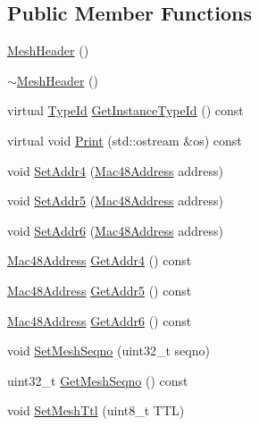 \subsection*{Public Member Functions}
\begin{DoxyCompactItemize}
\item 
\hyperlink{classns3_1_1dot11s_1_1MeshHeader_a0b260de050eab21794a300ad90af8257}{Mesh\+Header} ()
\item 
\hyperlink{classns3_1_1dot11s_1_1MeshHeader_a0dcc776fde719ec3a221f64a321d8484}{$\sim$\+Mesh\+Header} ()
\item 
virtual \hyperlink{classns3_1_1TypeId}{Type\+Id} \hyperlink{classns3_1_1dot11s_1_1MeshHeader_ad233531def8dbaf5250413efa6a1fe98}{Get\+Instance\+Type\+Id} () const 
\item 
virtual void \hyperlink{classns3_1_1dot11s_1_1MeshHeader_acf846f77244d80fb3770942851dc943a}{Print} (std\+::ostream \&os) const 
\item 
void \hyperlink{classns3_1_1dot11s_1_1MeshHeader_acd4f196e526875a606381c9cb950d725}{Set\+Addr4} (\hyperlink{classns3_1_1Mac48Address}{Mac48\+Address} address)
\item 
void \hyperlink{classns3_1_1dot11s_1_1MeshHeader_accb296eb081e0836fcd14ac45cb9593a}{Set\+Addr5} (\hyperlink{classns3_1_1Mac48Address}{Mac48\+Address} address)
\item 
void \hyperlink{classns3_1_1dot11s_1_1MeshHeader_a110598585d177d68f37d368b278cb317}{Set\+Addr6} (\hyperlink{classns3_1_1Mac48Address}{Mac48\+Address} address)
\item 
\hyperlink{classns3_1_1Mac48Address}{Mac48\+Address} \hyperlink{classns3_1_1dot11s_1_1MeshHeader_ac07c8456bc9b08aa8bff7c6606deb4f7}{Get\+Addr4} () const 
\item 
\hyperlink{classns3_1_1Mac48Address}{Mac48\+Address} \hyperlink{classns3_1_1dot11s_1_1MeshHeader_a39a4f8afcca3038e8720dbec8ef631d9}{Get\+Addr5} () const 
\item 
\hyperlink{classns3_1_1Mac48Address}{Mac48\+Address} \hyperlink{classns3_1_1dot11s_1_1MeshHeader_a9bc1a387341b0bd46c7cbfafac29e99d}{Get\+Addr6} () const 
\item 
void \hyperlink{classns3_1_1dot11s_1_1MeshHeader_a120bb1f7c7e741bd518a8973b870685a}{Set\+Mesh\+Seqno} (uint32\+\_\+t seqno)
\item 
uint32\+\_\+t \hyperlink{classns3_1_1dot11s_1_1MeshHeader_a06692df78a244dc80e9e3c737b6fd0f2}{Get\+Mesh\+Seqno} () const 
\item 
void \hyperlink{classns3_1_1dot11s_1_1MeshHeader_a415c88e6de2716bd6d10bbb848a80c90}{Set\+Mesh\+Ttl} (uint8\+\_\+t T\+TL)

\end{DoxyCompactItemize}

